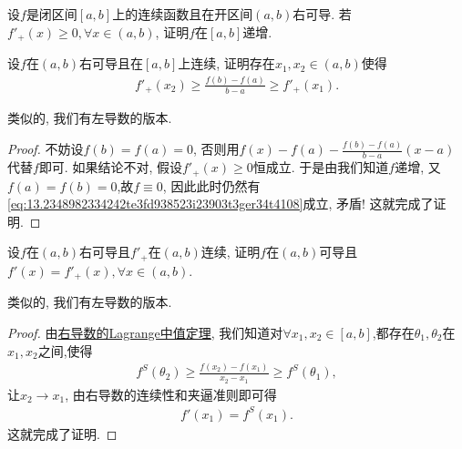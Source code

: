 \documentclass[../../main.tex]{subfiles}
\begin{document}
\begin{corollary}[右可导函数非负则递增]\label{corollary:右可导函数非负则递增}
设$f$是闭区间$[a,b]$上的连续函数且在开区间$(a,b)$右可导. 若$f'_+(x) \geqslant 0, \forall x \in (a,b)$, 证明$f$在$[a,b]$递增.
\end{corollary}

\begin{theorem}[右导数的Lagrange中值定理]\label{theorem:右导数的Lagrange中值定理}
设$f$在$(a,b)$右可导且在$[a,b]$上连续, 证明存在$x_1,x_2 \in (a,b)$使得
\begin{align}
f'_+(x_2) \geqslant \frac{f(b) - f(a)}{b - a} \geqslant f'_+(x_1). \label{eq:13.2348982334242te3fd938523i23903t3ger34t4108}
\end{align}
\end{theorem}
\begin{note}
类似的, 我们有左导数的版本.
\end{note}
\begin{proof}
不妨设$f(b) = f(a) = 0$, 否则用$f(x) - f(a) - \frac{f(b)-f(a)}{b - a}(x - a)$代替$f$即可.
如果结论不对, 假设$f'_+(x) \geqslant 0$恒成立. 于是由我们知道$f$递增, 又$f(a)=f(b)=0$,故$f \equiv 0$, 因此此时仍然有\eqref{eq:13.2348982334242te3fd938523i23903t3ger34t4108}成立, 矛盾! 这就完成了证明.

\end{proof}

\begin{proposition}[右导数连续则原函数可导]\label{proposition:右导数连续则原函数可导}
设$f$在$(a,b)$右可导且$f'_+$在$(a,b)$连续, 证明$f$在$(a,b)$可导且$f'(x) = f'_+(x), \forall x \in (a,b)$.
\end{proposition}
\begin{note}
类似的, 我们有左导数的版本.
\end{note}
\begin{proof}
由\hyperref[theorem:右导数的Lagrange中值定理]{右导数的Lagrange中值定理}, 我们知道对$\forall x_1,x_2\in [a,b]$,都存在$\theta_1,\theta_2$在$x_1,x_2$之间,使得
\begin{align*}
f^S(\theta_2) \geqslant \frac{f(x_2) - f(x_1)}{x_2 - x_1} \geqslant f^S(\theta_1),
\end{align*}
让$x_2 \to x_1$, 由右导数的连续性和夹逼准则即可得
\begin{align*}
f'(x_1) = f^S(x_1).
\end{align*}
这就完成了证明.

\end{proof}
\end{document}
